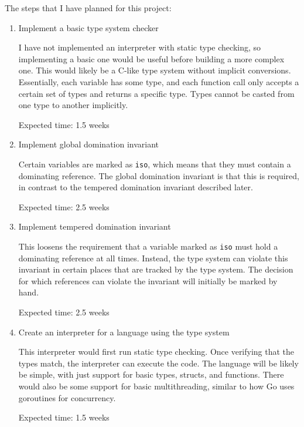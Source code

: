 \documentclass{article}
\begin{document}
  The steps that I have planned for this project:
  \begin{enumerate}
    \item Implement a basic type system checker
    
      I have not implemented an interpreter with static type checking,
        so implementing a basic one would be useful
        before building a more complex one.
      This would likely be a C-like type system without implicit conversions.
      Essentially,
        each variable has some type,
        and each function call only accepts a certain set of types
        and returns a specific type.
      Types cannot be casted from one type to another implicitly.

      Expected time: 1.5 weeks

    \item Implement global domination invariant

      Certain variables are marked as \verb+iso+,
        which means that they must contain a dominating reference.
      The global domination invariant is that this is required,
        in contrast to the tempered domination invariant described later.

      Expected time: 2.5 weeks

    \item Implement tempered domination invariant 

      This loosens the requirement that a variable marked as \verb+iso+
        must hold a dominating reference at all times.
      Instead,
        the type system can violate this invariant in certain places
        that are tracked by the type system.
      The decision for which references can violate the invariant
        will initially be marked by hand.
      
      Expected time: 2.5 weeks

    \item Create an interpreter for a language using the type system
    
      This interpreter would first run static type checking.
      Once verifying that the types match,
        the interpreter can execute the code.
      The language will be likely be simple,
        with just support for basic types, structs, and functions.
      There would also be some support for basic multithreading,
        similar to how Go uses goroutines for concurrency.

      Expected time: 1.5 weeks
  \end{enumerate}
\end{document}
